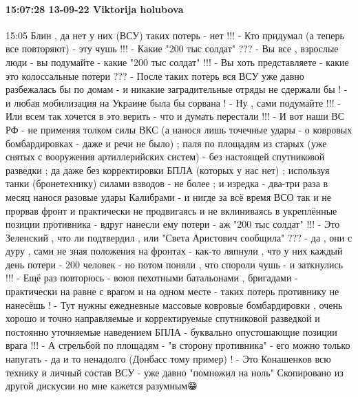 \paragraph{15:07:28 13-09-22 Viktorija holubova}

15:05
Блин , да нет у них (ВСУ) таких потерь - нет !!! - Кто придумал (а теперь все повторяют) - эту чушь !!! - Какие "200 тыс солдат" ???
- Вы все , взрослые люди - вы подумайте - какие "200 тыс солдат" !!! - Вы хоть представляете - какие это колоссальные потери ??? - После таких потерь вся ВСУ уже давно разбежалась бы по домам - и никакие заградительные отряды не сдержали бы ! - и любая мобилизация на Украине была бы сорвана ! - Ну , сами подумайте !!! - Или всем так хочется в это верить - что и думать перестали !!!
- И вот наши ВС РФ - не применяя толком силы ВКС (а нанося лишь точечные удары - о ковровых бомбардировках - даже и речи не было) ; паля по площадям из старых (уже снятых с вооружения артиллерийских систем) - без настоящей спутниковой разведки ; да даже без корректировки БПЛА (которых у нас нет) ; используя танки (бронетехнику) силами взводов - не более ; и изредка - два-три раза в месяц нанося разовые удары Калибрами - и нигде за всё время ВСО так и не прорвав фронт и практически не продвигаясь и не вклиниваясь в укреплённые позиции противника - вдруг нанесли ему потери - аж "200 тыс солдат" !!! - Это Зеленский , что ли подтвердил , или "Света Аристович сообщила" ??? - да , они с дуру , сами не зная положения на фронтах - как-то ляпнули , что у них каждый день потери - 200 человек - но потом поняли , что спороли чушь - и заткнулись !!!
- Ещё раз повторюсь - воюя пехотными батальонами , бригадами - практически на равне с врагом и на одном месте - таких потерь противнику не нанесёшь ! - Тут нужны ежедневные массовые ковровые бомбардировки , очень хорошо и точно направляемые и корректируемые спутниковой разведкой и постоянно уточняемые наведением БПЛА - буквально опустошающие позиции врага !!!
- А стрельбой по площадям - "в сторону противника" - его можно только напугать - да и то ненадолго (Донбасс тому пример) !
- Это Конашенков всю технику и личный состав ВСУ - уже давно "помножил на ноль"
Скопировано из другой дискусии но мне кажется разумным😁

